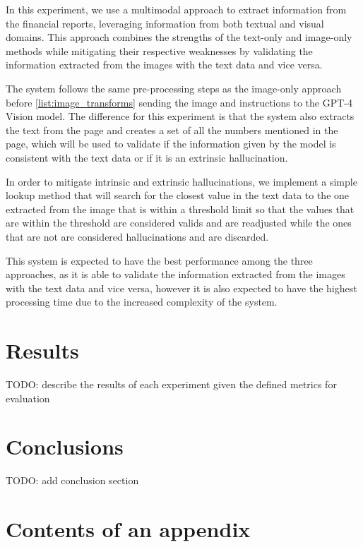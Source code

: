 \documentclass[english, 12pt, a4paper, elec, utf8, a-2b, online]{aaltothesis}
\begin{document}
In this experiment, we use a multimodal approach to extract information from the financial reports, leveraging information from both textual and visual domains.
This approach combines the strengths of the text-only and image-only methods while mitigating their respective weaknesses by validating the information extracted from the images with the text data and vice versa.

The system follows the same pre-processing steps as the image-only approach before \ref{list:image_transforms} sending the image and instructions to the \ac{GPT}-4 Vision model.
The difference for this experiment is that the system also extracts the text from the page and creates a set of all the numbers mentioned in the page, which will be used to validate if the information given by the model is consistent with the text data or if it is an extrinsic hallucination.

In order to mitigate intrinsic and extrinsic hallucinations, we implement a simple lookup method that will search for the closest value in the text data to the one extracted from the image that is within a threshold limit so that the values that are within the threshold are considered valids and are readjusted while the ones that are not are considered hallucinations and are discarded.

This system is expected to have the best performance among the three approaches, as it is able to validate the information extracted from the images with the text data and vice versa, however it is also expected to have the highest processing time due to the increased complexity of the system.

\clearpage
\section{Results}

TODO: describe the results of each experiment given the defined metrics for evaluation

\clearpage

\section{Conclusions}
\label{sec:summary}

TODO: add conclusion section


\clearpage
\thesisbibliography




\clearpage

\thesisappendix

\section{Contents of an appendix}
\label{app:contents}
\end{document}
